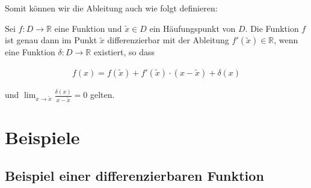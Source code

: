 \documentclass[fontsize=9pt,
               parskip=half-,
               DIV=14,
               listof=chapterentry,
               tocflat]{scrbook}
\begin{document}
Somit können wir die Ableitung auch wie folgt definieren:

\begin{definition*}
Sei $f:D\to \mathbb {R} $ eine Funktion und ${\tilde {x}}\in D$ ein Häufungspunkt von $D$. Die Funktion $f$ ist genau dann im Punkt ${\tilde {x}}$ differenzierbar mit der Ableitung $f'({\tilde {x}})\in \mathbb {R} $, wenn eine Funktion $\delta :D\to \mathbb {R} $ existiert, so dass

\begin{align*}
f(x)=f({\tilde {x}})+f'({\tilde {x}})\cdot (x-{\tilde {x}})+\delta (x)
\end{align*}

und $\lim _{x\to {\tilde {x}}}{\tfrac {\delta (x)}{x-{\tilde {x}}}}=0$ gelten.

\end{definition*}

\section{Beispiele}

\subsection{Beispiel einer differenzierbaren Funktion}
\end{document}
